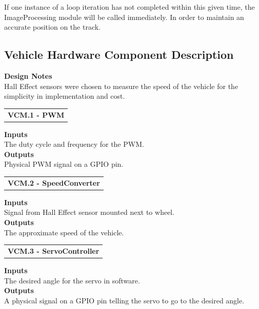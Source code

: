 \documentclass [10pt]{article}
\begin{document}
 
If one instance of a loop iteration has not completed within this given time, the ImageProcessing module will be called immediately. In order to maintain an accurate position on the track.

\subsection{Vehicle Hardware Component Description}

\textbf{Design Notes} \\
Hall Effect sensors were chosen to measure the speed of the vehicle for the simplicity in implementation and cost. \\

\begin{longtable}{p{}}
\rowcolor{tableCell}\textbf{VCM.1 - PWM} \\
\end{longtable}

\textbf{Inputs} \\ The duty cycle and frequency for the PWM.
 \\

\textbf{Outputs} \\
Physical PWM signal on a GPIO pin. \\

\begin{longtable}{p{}}
\rowcolor{tableCell}\textbf{VCM.2 - SpeedConverter} \\
\end{longtable}

\textbf{Inputs} \\
Signal from Hall Effect sensor mounted next to wheel. \\

\textbf{Outputs} \\
The approximate speed of the vehicle. \\

\begin{longtable}{p{}}
\rowcolor{tableCell}\textbf{VCM.3 - ServoController} \\
\end{longtable}

\textbf{Inputs} \\
The desired angle for the servo in software. \\

\textbf{Outputs} \\
A physical signal on a GPIO pin telling the servo to go to the desired angle. \\
\end{document}
